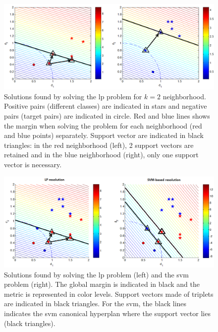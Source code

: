 \begin{figure}[h!]
	\centering
	\begin{minipage}[b]{1\linewidth}
		\centerline{\includegraphics[width=1\linewidth]{images/InterpretationLP}}
	\end{minipage}
	\caption{Solutions found by solving the {\sc lp} problem for $k=2$ neighborhood. Positive pairs (different classes) are indicated in stars and negative pairs (target pairs) are indicated in circle. Red and blue lines shows the margin when solving the problem for each neighborhood (red and blue points) separately. Support vector are indicated in black triangles: in the red neighborhood (left), 2 support vectors are retained and in the blue neighborhood (right), only one support vector is necessary.}
	\label{fig:LP_separate}
\end{figure}

\begin{figure}[h!]
	\centering
	\begin{minipage}[b]{1\linewidth}
		\centerline{\includegraphics[width=1\linewidth]{images/InterpretationLP_SVM}}
	\end{minipage}
	\caption{Solutions found by solving the {\sc lp} problem (left) and the {\sc svm} problem (right). The global margin is indicated in black and the metric is represented in color levels. Support vectors made of triplets are indicated in black triangles. For the {\sc svm}, the black lines indicates the {\sc svm} canonical hyperplan where the support vector lies (black triangles).}
	\label{fig:Linear}
\end{figure}

